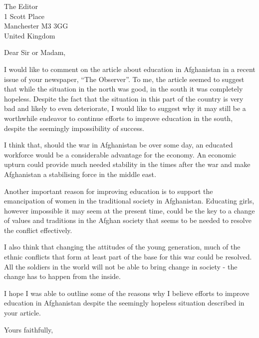 \documentclass{letter}
\begin{document}
\onehalfspacing
{}\selectfont

\begin{letter}{The Editor \\
1 Scott Place \\
Manchester M3 3GG \\
United Kingdom}

\opening{Dear Sir or Madam,}

I would like to comment on the article about education in Afghanistan in a recent issue of your newspaper, ``The Observer''. To me, the article seemed to suggest that while the situation in the north was good, in the south it was completely hopeless. Despite the fact that the situation in this part of the country is very bad and likely to even deteriorate, I would like to suggest why it may still be a worthwhile endeavor to continue efforts to improve education in the south, despite the seemingly impossibility of success.

I think that, should the war in Afghanistan be over some day, an educated workforce would be a considerable advantage for the economy. An economic upturn could provide much needed stability in the times after the war and make Afghanistan a stabilising force in the middle east.

Another important reason for improving education is to support the emancipation of women in the traditional society in Afghanistan. Educating girls, however impossible it may seem at the present time, could be the key to a change of values and traditions in the Afghan society that seems to be needed to resolve the conflict effectively.

I also think that changing the attitudes of the young generation, much of the ethnic conflicts that form at least part of the base for this war could be resolved. All the soldiers in the world will not be able to bring change in society - the change has to happen from the inside.

I hope I was able to outline some of the reasons why I believe efforts to improve education in Afghanistan despite the seemingly hopeless situation described in your article.

\closing{Yours faithfully,}
\end{letter}
\end{document}
